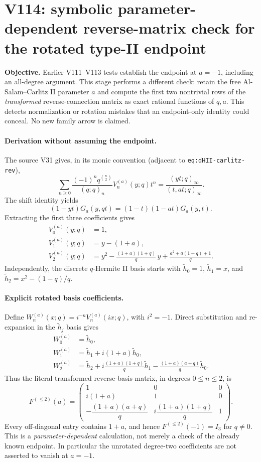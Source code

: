 \documentclass[11pt]{article}
\begin{document}
\clearpage
\section{V114: symbolic parameter-dependent reverse-matrix check for the rotated type-II endpoint}
\noindent\textbf{Objective.} Earlier V111--V113 tests establish the endpoint at $a=-1$, including an all-degree argument. This stage performs a different check: retain the free Al-Salam--Carlitz II parameter $a$ and compute the first two nontrivial rows of the \emph{transformed} reverse-connection matrix as exact rational functions of $q,a$. This detects normalization or rotation mistakes that an endpoint-only identity could conceal. No new family arrow is claimed.

\paragraph{Derivation without assuming the endpoint.}
The source V31 gives, in its monic convention (adjacent to \texttt{eq:dHII-carlitz-rev}),
\[
 \sum_{n\ge0}\frac{(-1)^nq^{\binom n2}}{(q;q)_n}V_n^{(a)}(y;q)t^n
 =\frac{(yt;q)_\infty}{(t,at;q)_\infty}.
\]
The shift identity yields
\[
 (1-yt)G_a(y,qt)=(1-t)(1-at)G_a(y,t).
\]
Extracting the first three coefficients gives
\begin{align*}
 V_0^{(a)}(y;q)&=1,\\
 V_1^{(a)}(y;q)&=y-(1+a),\\
 V_2^{(a)}(y;q)&=y^2-\frac{(1+a)(1+q)}q\,y
 +\frac{a^2+a(1+q)+1}{q}.
\end{align*}
Independently, the discrete $q$-Hermite II basis starts with
$\widetilde h_0=1$, $\widetilde h_1=x$, and
$\widetilde h_2=x^2-(1-q)/q$.

\paragraph{Explicit rotated basis coefficients.}
Define $W_n^{(a)}(x;q)=i^{-n}V_n^{(a)}(ix;q)$, with $i^2=-1$.
Direct substitution and re-expansion in the $\widetilde h_j$ basis gives
\begin{align}
 W_0^{(a)}&=\widetilde h_0,\nonumber\\
 W_1^{(a)}&=\widetilde h_1+i(1+a)\widetilde h_0,\label{eq:v114-row1}\\
 W_2^{(a)}&=\widetilde h_2
 +i\frac{(1+a)(1+q)}q\widetilde h_1
 -\frac{(1+a)(a+q)}q\widetilde h_0.
 \label{eq:v114-row2}
\end{align}
Thus the literal transformed reverse-basis matrix, in degrees $0\le n\le2$, is
\[
 \boxed{F^{(\le2)}(a)=
 \begin{pmatrix}
 1&0&0\\
 i(1+a)&1&0\\
 -\dfrac{(1+a)(a+q)}q&i\dfrac{(1+a)(1+q)}q&1
 \end{pmatrix}.}
\]
Every off-diagonal entry contains $1+a$, and hence $F^{(\le2)}(-1)=I_3$ for $q\ne0$. This is a \emph{parameter-dependent} calculation, not merely a check of the already known endpoint. In particular the unrotated degree-two coefficients are not asserted to vanish at $a=-1$.
\end{document}
